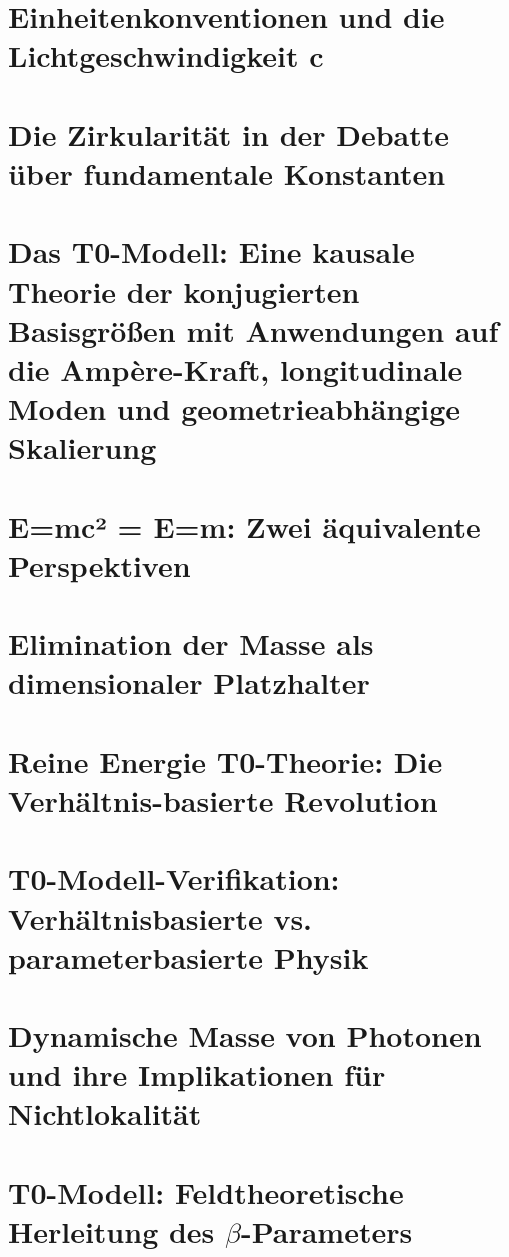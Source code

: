 	\chapter{Einheitenkonventionen und die Lichtgeschwindigkeit c}
	
	\chapter{Die Zirkularität in der Debatte über fundamentale Konstanten}
	
	\chapter{Das T0-Modell: Eine kausale Theorie der konjugierten Basisgrößen mit Anwendungen auf die Ampère-Kraft, longitudinale Moden und geometrieabhängige Skalierung}
	
	\chapter{E=mc² = E=m: Zwei äquivalente Perspektiven}
	
	\chapter{Elimination der Masse als dimensionaler Platzhalter}
	
	\chapter{Reine Energie T0-Theorie: Die Verhältnis-basierte Revolution}
	
	\chapter{T0-Modell-Verifikation: Verhältnisbasierte vs. parameterbasierte Physik}
	
	\chapter{Dynamische Masse von Photonen und ihre Implikationen für Nichtlokalität}
	
	\chapter{T0-Modell: Feldtheoretische Herleitung des $\beta$-Parameters}
	
